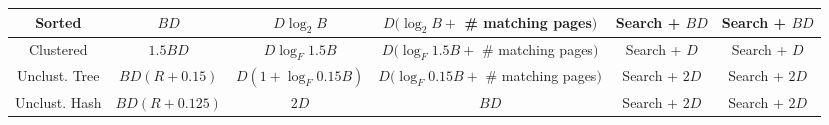 \documentclass[landscape,8pt]{extarticle}
\begin{document}
\begin{multicols}{4}
\begin{center}
\begin{adjustbox}{angle=270}
\begin{tabular}{ | c | c | c | c | c | c | }
                Sorted        & $BD$          & $D \log_2 B$          & $D(\log_2 B +$ \# matching pages$)$      & Search + $BD$ & Search + $BD$ \\ \midrule
                Clustered     & $1.5 BD$      & $D \log_F 1.5 B$      & $D(\log_F 1.5B + $ \# matching pages$)$  & Search + $D$  & Search + $D$  \\ \midrule
                Unclust. Tree & $BD(R+0.15)$  & $D(1 + \log_F 0.15B)$ & $D(\log_F 0.15B + $ \# matching pages$)$ & Search + $2D$ & Search + $2D$ \\ \midrule
                Unclust. Hash & $BD(R+0.125)$ & $2D$                  & $BD$                                     & Search + $2D$ & Search + $2D$ \\ \bottomrule
            \end{tabular}
        \end{adjustbox}
    \end{center}
\end{multicols}
\end{document}
